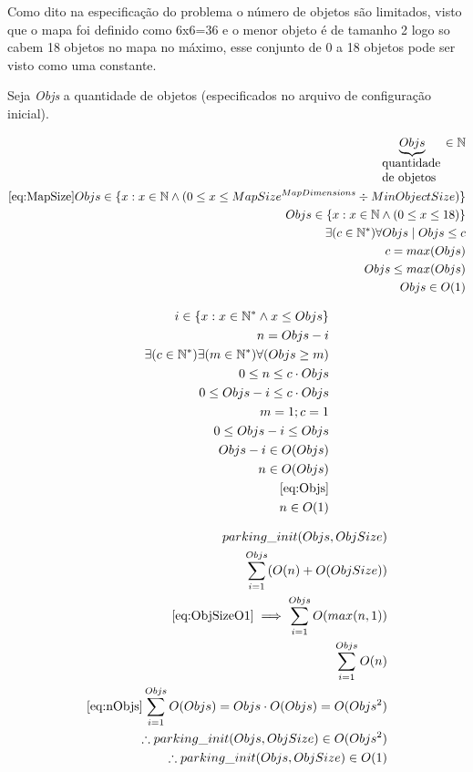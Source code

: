 \documentclass[11pt]{article}
\begin{document}
Como dito na especificação do problema o número de objetos são limitados, visto que o mapa foi definido como 6x6=36 e o menor objeto é de tamanho 2 logo so cabem 18 objetos no mapa no máximo, esse conjunto de 0 a 18 objetos pode ser visto como uma constante.

Seja \emph{Objs} a quantidade de objetos (especificados no arquivo de configuração inicial).

\begin{equation}\label{eq:Objs}
\begin{aligned}
\underbrace{Objs}_{\parbox{1.75cm}{ quantidade de objetos}}\in \mathbb{N}\\
\eqref{eq:MapSize} Objs \in \{x : x \in \mathbb{N} \land (0 \leq x \leq MapSize^{MapDimensions}\div MinObjectSize)\}\\
Objs \in \{x : x \in \mathbb{N} \land (0 \leq x \leq 18)\}\\
\exists (c \in \mathbb{N^{*}}) \forall Objs \mid Objs \leq c\\
c = max(Objs)\\
Objs \leq max(Objs)\\
Objs \in O(1)
\end{aligned}
\end{equation}

\begin{equation}\label{eq:nObjs}
\begin{aligned}
i \in \{x : x \in \mathbb{N^{*}} \land  x \leq Objs\}\\
n = Objs-i\\
\exists (c \in \mathbb{N^{*}}) \exists (m \in \mathbb{N^{*}}) \forall (Objs \geq m)\\
0 \leq n \leq c\cdot Objs\\
0 \leq Objs-i \leq c\cdot Objs\\
m = 1; c = 1\\
0 \leq Objs-i \leq Objs\\
Objs-i \in O(Objs)\\
n \in O(Objs)\\
\eqref{eq:Objs}\\
n \in O(1)\\
\end{aligned}
\end{equation}

\begin{equation}\label{eq:parkinginit}
\begin{aligned}
parking\_init(Objs,ObjSize)\\
\sum_{i=1}^{Objs} (O(n)+O(ObjSize))\\
\eqref{eq:ObjSizeO1} \implies \sum_{i=1}^{Objs} O(max(n,1))\\
\sum_{i=1}^{Objs} O(n)\\
\eqref{eq:nObjs} \sum_{i=1}^{Objs} O(Objs) = Objs\cdot O(Objs) = O(Objs^2)\\
\therefore parking\_init(Objs,ObjSize) \in O(Objs^{2})\\
\therefore parking\_init(Objs,ObjSize) \in O(1)\\
\end{aligned}
\end{equation}
\end{document}
